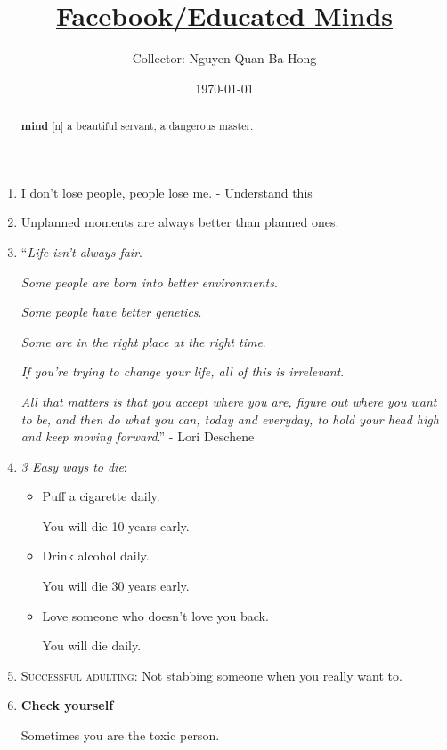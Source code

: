 \documentclass{article}
\title{\href{https://www.facebook.com/EducatedMindsPage}{Facebook/Educated Minds}}
\author{Collector: Nguyen Quan Ba Hong}
\date{\today}
\numberwithin{equation}{section}
\begin{document}
\maketitle
\begin{abstract}
    \textbf{mind} [n] a beautiful servant, a dangerous master.
\end{abstract}
\setcounter{secnumdepth}{6}
\setcounter{tocdepth}{6}


\begin{enumerate}
    \item I don't lose people, people lose me. - Understand this
    \item Unplanned moments are always better than planned ones.
    \item ``\textit{Life isn't always fair}.
    
    \textit{Some people are born into better environments}.
    
    \textit{Some people have better genetics}.
    
    \textit{Some are in the right place at the right time}.
    
    \textit{If you're trying to change your life, all of this is irrelevant}.
    
    \textit{All that matters is that you accept where you are, figure out where you want to be, and then do what you can, today and everyday, to hold your head high and keep moving forward}.'' - Lori Deschene
    \item \textit{3 Easy ways to die}:
    \begin{itemize}
        \item Puff a cigarette daily.
        
        You will die 10 years early.
        \item Drink alcohol daily.
        
        You will die 30 years early.
        \item Love someone who doesn't love you back.
        
        You will die daily.
    \end{itemize}
    \item \textsc{Successful adulting}: Not stabbing someone when you really want to.
    \item \textbf{Check yourself}
    
    Sometimes you are the toxic person.
    

\end{enumerate}
\end{document}
